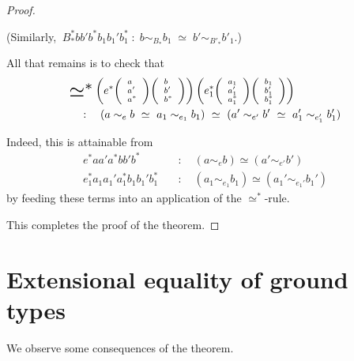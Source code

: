 \documentclass[10pt]{article}
\newcommand{\of}{\quad : \quad}
\newcommand{\bseq}{\raisebox{-1mm}{\scalebox{1.8}{${\eeq^*}$}}}
\newcommand{\eeq}{\simeq}
\newcommand{\seq}{{\eeq}^*}
\newcommand{\tripar}[3]{
{\scriptsize \left(
  \begin{array}{l}
    {#1}\\
    {#2}\\
    {#3}
  \end{array}
\right)}}
\begin{document}
\begin{proof}
\begin{description}
(Similarly, $\ B_*^* b b' b^* b_1 b_1' b_1^* \; : \;
b \sim_{B_*} b_1 \;\eeq\; b' \sim_{B'_*} b'_1 $.)

All that remains is to check that
\begin{align*}
&\bseq \left(e^* \tripar{a}{a'}{a^*}
  \tripar{b}{b'}{b^*}\right)
\left(e_1^* \tripar{a_1}{a_1'}{a_1^*}
  \tripar{b_1}{b_1'}{b_1^*}\right)\\
&\of 
(a \sim_e b \ \eeq\ a_1 \sim_{e_1} b_1) \ \eeq \
(a' \sim_{e'} b' \ \eeq\ a'_1 \sim_{e'_1} b'_1)
\end{align*}

Indeed, this is attainable from
\begin{align*}
  e^* a a' a^* b b' b^* &\of (a \sim_e b) \eeq (a' \sim_{e'} b')\\
  e_1^* a_1 a_1' a_1^* b_1 b_1' b_1^* &\of
(a_1 \sim_{e_1} b_1) \eeq (a_1' \sim_{e_1'} b_1')
\end{align*}
by feeding these terms into an application of the $\seq$-rule.
\end{description}
This completes the proof of the theorem.
\end{proof}

\section{Extensional equality of ground types}
\label{s:exte}

We observe some consequences of the theorem.
\end{document}

